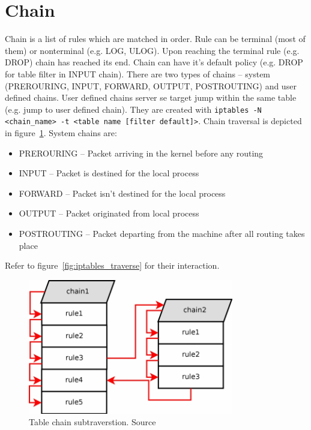 \documentclass[times, utf8, seminar, english]{fer}
\begin{document}
\section{Chain}
    Chain is a list of rules which are matched in order. Rule can be terminal (most of them) or nonterminal (e.g. LOG,  ULOG). Upon reaching the terminal rule (e.g. DROP) chain has reached its end. Chain can have it's default policy (e.g. DROP for table filter in INPUT chain).
    There are two types of chains -- system (PREROURING, INPUT, FORWARD, OUTPUT, POSTROUTING) and user defined chains.
    User defined chains server se target jump within the same table (e.g. jump to user defined chain).
    They are created with \verb|iptables -N <chain_name> -t <table name [filter default]>|.
    Chain traversal is depicted in figure~\ref{fig:iptables_subtraverse}. System chains are:

    \begin{itemize}
        \item PREROURING -- Packet arriving in the kernel before any routing
        \item INPUT -- Packet is destined for the local process
        \item FORWARD -- Packet isn't destined for the local process
        \item OUTPUT -- Packet originated from local process
        \item POSTROUTING -- Packet departing from the machine after all routing takes place
    \end{itemize}
    Refer to figure~\ref{fig:iptables_traverse} for their interaction.

    \begin{figure}
        \centering
        \includegraphics[width=0.8\textwidth]{table_subtraverse}
        \caption{Table chain subtraverstion. Source~\cite{Iptables99:online}}
        \label{fig:iptables_subtraverse}
    \end{figure}
\end{document}
